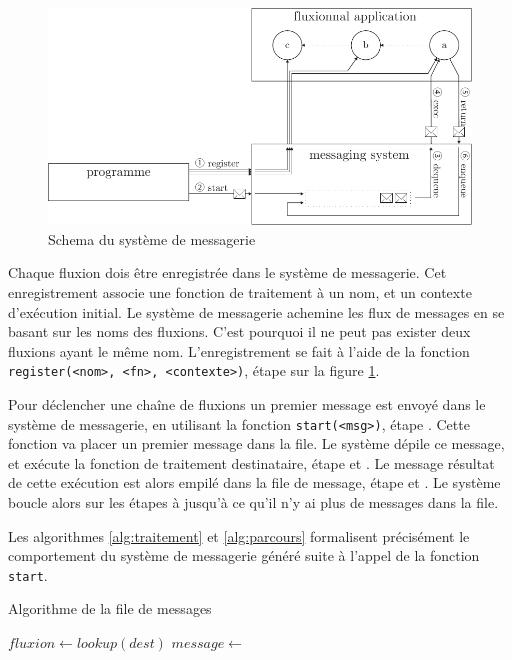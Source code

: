 \begin{figure}[h!]
  \includegraphics[width=\linewidth]{schema-message.pdf}
  \caption{Schema du système de messagerie}
  \label{fig:messagerie}
\end{figure}

Chaque fluxion dois être enregistrée dans le système de messagerie.
Cet enregistrement associe une fonction de traitement à un nom, et un contexte d'exécution initial.
Le système de messagerie achemine les flux de messages en se basant sur les noms des fluxions.
C'est pourquoi il ne peut pas exister deux fluxions ayant le même nom.
L'enregistrement se fait à l'aide de la fonction \texttt{register(<nom>, <fn>, <contexte>)}, étape  sur la figure \ref{fig:messagerie}.

Pour déclencher une chaîne de fluxions un premier message est envoyé dans le système de messagerie, en utilisant la fonction \texttt{start(<msg>)}, étape .
Cette fonction va placer un premier message dans la file.
Le système dépile ce message, et exécute la fonction de traitement destinataire, étape  et .
Le message résultat de cette exécution est alors empilé dans la file de message, étape  et .
Le système boucle alors sur les étapes  à  jusqu'à ce qu'il n'y ai plus de messages dans la file.

Les algorithmes \ref{alg:traitement} et \ref{alg:parcours} formalisent précisément le comportement du système de messagerie généré suite à l'appel de la fonction \texttt{start}.

\begin{algorithm}
\caption{Algorithme de la file de messages}
\label{alg:traitement}
\begin{algorithmic}
\State $fluxion \gets lookup(dest)$
\State $message \gets$  
\State {} 
\EndFor
\EndFunction
\end{algorithmic}
\end{algorithm}

